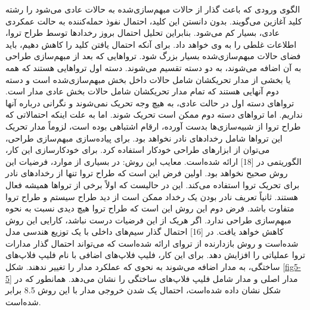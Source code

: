 الگوی ورودی که باعث گذار از حالات مبهم‌سازی‌شده به حالات عادی می‌شود را رشته کلید آغازین می‌گویند. بدون دانستن این کلید، احتمال نفوذ حمله‌کننده به حالت عمکردی عادی، بسیار کم می‌شود. بنابراین تحلیل احتمال بروز رخدادها توسط طراح تروا، اطلاعات غلطی را به وی خواهد داد.  برای آنکه احتمال یافتن کلید را کاهش دهیم، باید فضای حالات مبهم‌سازی‌شده بسیار بزرگ شود. تروا‌هایی که بعد از مبهم‌سازی طراحی به آن اضافه می‌شوند، به دو دسته تقسیم می‌شوند. دسته اول تروا‌هایی هستند که همه یا بخشی از مدار تحریکشان شامل حالات داخل بخش مبهم‌سازی‌شده ‌است و دسته دوم آنهایی هستند که تمام مدار تحریکشان شامل حالات بخش عادی مدار است. تروا‌های دسته اول در حالت عادی، به هیچ وجه تحریک نمی‌شوند و نگرانی درباره آنها نداریم. اما تروا‌های دسته دوم ممکن است تحریک شوند. اما به علت اینکه احتمالاتی که طراح تروا از شبیه‌سازی‌ها بدست آورده، ارقام اشتباهی بوده است، لزوماً مدار تحریک این تروا‌ها شامل رخدادهای نادر نخواهد بود. برای پیاده‌سازی مبهم‌سازی طراحی، می‌توان از ابزارهای طراحی خودکار استفاده کرد. برای خودکارسازی این کار، الگوریتمی در [18] ارائه شده‌است.
معایب این روش:
در بسیاری از موارد، فرضیات این روش صحیح نخواهد بود. اولین فرض این است که طراح تروا تنها از رخدادهای نادر برای تحریک تروا استفاده می‌کند. این در حالیست که اولاً برخی از تروا‌ها همیشه فعال هستند. ثانیاً تعریف نادر بودن یک رخداد ممکن است از دید طراح سیستم و طراح تروا متفاوت باشد. فرض دوم این روش این است که طراح  تروا هیچ دیدی نسبت به نحوه مبهم‌سازی طراحی ندارد. اگر هریک از این فرضیات درست نباشد، کارایی این روش کاهش خواهد یافت.
در [16] احتمال گذار سیم‌های داخلی با یک توزیع هندسی مدل شده‌است و روش بازدارنده از تروای ارائه شده‌است که می‌تواند احتمال گذار مدارات تروا عملیاتی را افزایش دهد. برای این کار، فلیپ فلاپ‌های اضافی با نام فلیپ فلاپ‌های ساختگی، به مدار اضافه می‌شوند به نحوی که عملکرد مدار را تغییر ندهند. شکل \ref{fig5-5} مدار اصلی و مدار شامل فلیپ فلاپ‌های ساختگی را نشان می‌دهد. همانطور که در شکل نشان داده شده‌است، احتمال یک شدن خروجی مدار با این روش 8.5 برابر شده‌است.
 
